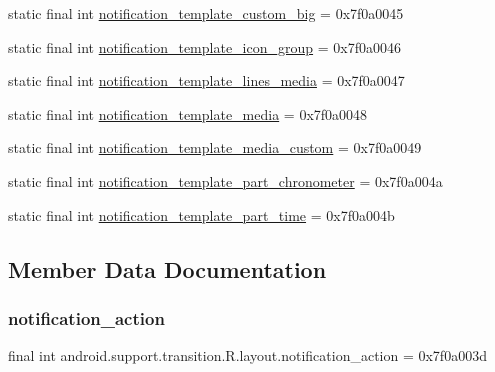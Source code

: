 \begin{DoxyCompactItemize}
static final int \mbox{\hyperlink{classandroid_1_1support_1_1transition_1_1R_1_1layout_ad75a504838c07c3ddefc6665e6a00f3a}{notification\+\_\+template\+\_\+custom\+\_\+big}} = 0x7f0a0045
\item 
static final int \mbox{\hyperlink{classandroid_1_1support_1_1transition_1_1R_1_1layout_a64b8e888e8b70c0d633e86bb6c90393f}{notification\+\_\+template\+\_\+icon\+\_\+group}} = 0x7f0a0046
\item 
static final int \mbox{\hyperlink{classandroid_1_1support_1_1transition_1_1R_1_1layout_ad6dee23c02d0b3e056701f3a52906dab}{notification\+\_\+template\+\_\+lines\+\_\+media}} = 0x7f0a0047
\item 
static final int \mbox{\hyperlink{classandroid_1_1support_1_1transition_1_1R_1_1layout_a81a3d59c544293148376ed0805ccd494}{notification\+\_\+template\+\_\+media}} = 0x7f0a0048
\item 
static final int \mbox{\hyperlink{classandroid_1_1support_1_1transition_1_1R_1_1layout_a345f647d80ae1d175515f1b7ff5a356e}{notification\+\_\+template\+\_\+media\+\_\+custom}} = 0x7f0a0049
\item 
static final int \mbox{\hyperlink{classandroid_1_1support_1_1transition_1_1R_1_1layout_a7a65ce710da544bde7dcf66de2a35a68}{notification\+\_\+template\+\_\+part\+\_\+chronometer}} = 0x7f0a004a
\item 
static final int \mbox{\hyperlink{classandroid_1_1support_1_1transition_1_1R_1_1layout_aa67b5ed098ab3763d52f82b3e2edd7b3}{notification\+\_\+template\+\_\+part\+\_\+time}} = 0x7f0a004b
\end{DoxyCompactItemize}


\subsection{Member Data Documentation}
\mbox{\label{classandroid_1_1support_1_1transition_1_1R_1_1layout_a3134dda494a06cd67a831ff544ed3794}} 
\subsubsection{\texorpdfstring{notification\+\_\+action}{notification\_action}}
{\footnotesize\ttfamily final int android.\+support.\+transition.\+R.\+layout.\+notification\+\_\+action = 0x7f0a003d\hspace{0.3cm}{\ttfamily [static]}}

